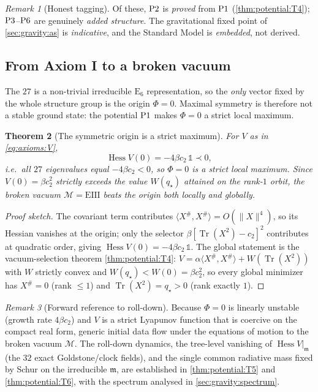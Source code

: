 \documentclass[11pt]{article}
\theoremstyle{plain}
\newtheorem{theorem}{Theorem}[section]
\theoremstyle{definition}
\theoremstyle{remark}
\newtheorem{remark}[theorem]{Remark}
\newcommand{\E}[1]{\mathrm{E}_{#1}}
\newcommand{\Hess}{\operatorname{Hess}}
\newcommand{\Tr}{\operatorname{Tr}}
\newcommand{\M}{\mathcal{M}}
\newcommand{\ESix}{\E{6}}
\newcommand{\Pone}{\textnormal{P1}}
\newcommand{\Ptwo}{\textnormal{P2}}
\newcommand{\Pthree}{\textnormal{P3}}
\newcommand{\Psix}{\textnormal{P6}}
\begin{document}
\begin{remark}[Honest tagging]\label{rem:axioms:tagging}
Of these, $\Ptwo$ is \emph{proved} from $\Pone$ (\autoref{thm:potential:T4});
$\Pthree$--$\Psix$ are genuinely \emph{added structure}. The gravitational
fixed point of \autoref{sec:gravity:as} is \emph{indicative}, and the
Standard Model is \emph{embedded}, not derived.
\end{remark}

\subsection{From Axiom I to a broken vacuum}
\label{sec:axioms:broken}

The $27$ is a non-trivial irreducible $\ESix$ representation, so the
\emph{only} vector fixed by the whole structure group is the origin
$\Phi=0$. Maximal symmetry is therefore not a stable ground state: the
potential $\Pone$ makes $\Phi=0$ a strict local maximum.

\begin{theorem}[The symmetric origin is a strict maximum]\label{thm:axioms:origin}
For $V$ as in \eqref{eq:axioms:V},
\[
  \Hess V(0)=-4\beta c_2\,\mathbb 1\prec0,
\]
i.e.\ all $27$ eigenvalues equal $-4\beta c_2<0$, so $\Phi=0$ is a strict
local maximum. Since $V(0)=\beta c_2^2$ strictly exceeds the value
$W(q_\star)$ attained on the rank-$1$ orbit, the broken vacuum
$\M=\mathrm{EIII}$ beats the origin both locally and globally.
\end{theorem}

\begin{proof}[Proof sketch]
The covariant term contributes $\langle X^{\#},X^{\#}\rangle=O(\|X\|^4)$, so
its Hessian vanishes at the origin; only the selector $\beta[\Tr(X^2)-c_2]^2$
contributes at quadratic order, giving $\Hess V(0)=-4\beta c_2\,\mathbb 1$.
The global statement is the vacuum-selection theorem
\autoref{thm:potential:T4}: $V=\alpha\langle X^{\#},X^{\#}\rangle+W(\Tr(X^2))$
with $W$ strictly convex and $W(q_\star)<W(0)=\beta c_2^2$, so every global
minimizer has $X^{\#}=0$ (rank $\le1$) and $\Tr(X^2)=q_\star>0$ (rank
exactly $1$).
\end{proof}

\begin{remark}[Forward reference to roll-down]\label{rem:axioms:rolldown}
Because $\Phi=0$ is linearly unstable (growth rate $4\beta c_2$) and $V$ is a
strict Lyapunov function that is coercive on the compact real form, generic
initial data flow under the equations of motion to the broken vacuum $\M$.
The roll-down dynamics, the tree-level vanishing of $\Hess V|_{\mathfrak m}$
(the $32$ exact Goldstone/clock fields), and the single common radiative mass
fixed by Schur on the irreducible $\mathfrak m$, are established in
\autoref{thm:potential:T5} and \autoref{thm:potential:T6}, with the spectrum
analysed in \autoref{sec:gravity:spectrum}.
\end{remark}
\end{document}
